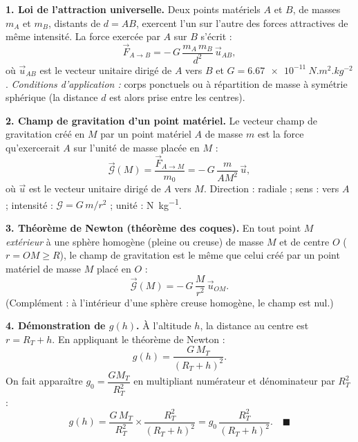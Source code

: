 \documentclass[11pt]{article}
\begin{document}
\begin{corrige}
\textbf{1. Loi de l'attraction universelle.} Deux points matériels $A$ et $B$, de masses $m_A$ et $m_B$, distants de $d = AB$, exercent l'un sur l'autre des forces attractives de même intensité. La force exercée par $A$ sur $B$ s'écrit :
\[
\vec{F}_{A\to B} = -\,G\,\frac{m_A\,m_B}{d^2}\,\vec{u}_{AB},
\]
où $\vec{u}_{AB}$ est le vecteur unitaire dirigé de $A$ vers $B$ et $G = \SI{6,67e-11}{N.m^2.kg^{-2}}$. \emph{Conditions d'application :} corps ponctuels ou à répartition de masse à symétrie sphérique (la distance $d$ est alors prise entre les centres).

\textbf{2. Champ de gravitation d'un point matériel.} Le vecteur champ de gravitation créé en $M$ par un point matériel $A$ de masse $m$ est la force qu'exercerait $A$ sur l'unité de masse placée en $M$ :
\[
\vec{\mathcal{G}}(M) = \frac{\vec{F}_{A\to M}}{m_0} = -\,G\,\frac{m}{AM^2}\,\vec{u},
\]
où $\vec{u}$ est le vecteur unitaire dirigé de $A$ vers $M$. Direction : radiale ; sens : vers $A$ ; intensité : $\mathcal{G} = G\,m/r^2$ ; unité : \si{N.kg^{-1}}.

\textbf{3. Théorème de Newton (théorème des coques).} En tout point $M$ \emph{extérieur} à une sphère homogène (pleine ou creuse) de masse $M$ et de centre $O$ ($r = OM \geq R$), le champ de gravitation est le même que celui créé par un point matériel de masse $M$ placé en $O$ :
\[
\vec{\mathcal{G}}(M) = -\,G\,\frac{M}{r^2}\,\vec{u}_{OM}.
\]
(Complément : à l'intérieur d'une sphère creuse homogène, le champ est nul.)

\textbf{4. Démonstration de $g(h)$.} À l'altitude $h$, la distance au centre est $r = R_T + h$. En appliquant le théorème de Newton :
\[
g(h) = \frac{G\,M_T}{(R_T+h)^2}.
\]
On fait apparaître $g_0 = \dfrac{G M_T}{R_T^2}$ en multipliant numérateur et dénominateur par $R_T^2$ :
\[
g(h) = \frac{G\,M_T}{R_T^2}\times\frac{R_T^2}{(R_T+h)^2} = g_0\,\frac{R_T^2}{(R_T+h)^2}. \quad \blacksquare
\]
\end{corrige}
\end{document}
